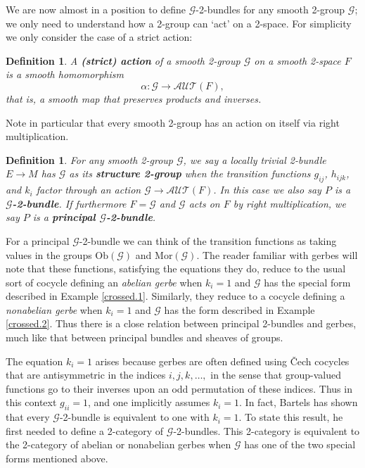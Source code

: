 \documentclass{article}
\newcommand{\maps}{\colon}
\newcommand{\AUT}{\mathcal{AUT}}
\newcommand{\Ob}{\mathrm{Ob}}
\newcommand{\Mor}{\mathrm{Mor}}
\def\twogroup {\mathcal{G}}
\newtheorem{definition}[theorem]{Definition}
\newcommand{\et}{\hspace{-0.08in}{\bf .}\hspace{0.1in}}
\begin{document}
We are now almost in a position to define $\twogroup$-2-bundles 
for any smooth 2-group $\twogroup$; we only need to understand
how a 2-group can `act' on a 2-space.  For simplicity we only
consider the case of a strict action:

\begin{definition} \et 
A {\bf (strict) action} of a smooth 2-group 
$\twogroup$ on a smooth 2-space $F$ is a smooth homomorphism
\[    \alpha \maps \twogroup \to \AUT(F) , \]
that is, a smooth map that preserves products and inverses.
\end{definition}

\noindent
Note in particular that every smooth 2-group has an action on itself
via right multiplication.

\begin{definition} \et
For any smooth 2-group $\twogroup$, we say a locally trivial
2-bundle $E \to M$ has $\twogroup$ as its {\bf structure 
2-group} when the transition functions $g_{ij}$, $h_{ijk}$, and 
$k_i$ factor through an action $\twogroup \to \AUT(F)$.  In this case we 
also say $P$ is a {\bf $\twogroup$-2-bundle}.
If furthermore $F = \twogroup$ and $\twogroup$ acts on $F$ by right
multiplication, we say $P$ is a {\bf principal $\twogroup$-2-bundle}.  
\end{definition}

For a principal $\twogroup$-2-bundle we can think of the transition 
functions as taking values in the groups $\Ob(\twogroup)$ and 
$\Mor(\twogroup)$.  The reader familiar with 
gerbes will note that these functions, satisfying the equations they do, 
reduce to the usual sort of cocycle defining an 
\emph{abelian gerbe} when $k_i = 1$ and $\twogroup$ has
the special form described in Example \ref{crossed.1}.  Similarly, 
they reduce to a cocycle defining a \emph{nonabelian gerbe}
when $k_i = 1$ and $\twogroup$ has the form described in 
Example \ref{crossed.2}.  Thus there is a close relation between
principal 2-bundles and gerbes, much like that between principal
bundles and sheaves of groups.

The equation $k_i = 1$ arises because gerbes 
are often defined using {\v C}ech cocycles that are antisymmetric 
in the indices $i,j,k,\dots,$ in the sense that group-valued functions 
go to their inverses upon an odd permutation of these indices.  Thus in 
this context $g_{ii} = 1$, and one implicitly assumes $k_i = 1$.    
In fact, Bartels \cite{Bartels:2004} has shown that every 
$\twogroup$-2-bundle is equivalent to one with $k_i = 1$.  To 
state this result, he first needed to define a 2-category of 
$\twogroup$-2-bundles.  This 2-category is equivalent to the 
2-category of abelian or nonabelian gerbes when $\twogroup$ has 
one of the two special forms mentioned above.
\end{document}
